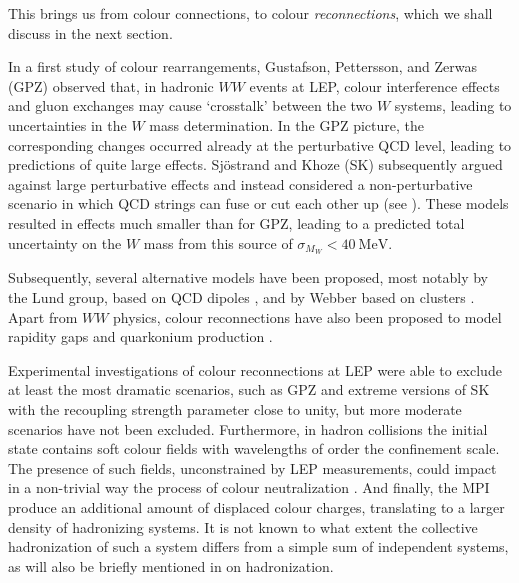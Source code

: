 This brings us from colour connections, to colour
\emph{reconnections}, which we shall discuss in the next section.

In a first study of colour rearrangements,
Gustafson, Pettersson, and Zerwas (GPZ) \cite{Gustafson:1988fs}
observed that, \eg in hadronic $WW$ events at LEP, colour interference
effects and gluon exchanges may cause `crosstalk' between the two
$W$ systems, leading \eg to uncertainties in the $W$ mass
determination.
In the GPZ picture, the corresponding changes occurred
already at the perturbative QCD level, leading to predictions
of quite large effects. Sj\"ostrand and Khoze (SK)
\cite{Sjostrand:1993rb,Sjostrand:1993hi}
subsequently argued against large perturbative effects
and instead considered a non-perturbative scenario in which
QCD strings can fuse or cut each other up (see \eg
\cite{Artru:1979ye}). These models resulted in
effects much smaller than for GPZ, leading to a predicted total uncertainty
on the $W$ mass from this source of $\sigma_{M_{W}}<40~\mathrm{MeV}$.

Subsequently, several alternative models have been proposed,
most notably by the Lund group, based on QCD dipoles
\cite{Gustafson:1994cd,Lonnblad:1995yk,Friberg:1996xc}, and by Webber based
on clusters \cite{Webber:1997iw}. Apart from $WW$ physics,
colour reconnections have also been proposed to model rapidity gaps
\cite{Buchmuller:1995qa,Edin:1995gi,Rathsman:1998tp,Enberg:2001vq}
and quarkonium production \cite{Edin:1997zb}.

Experimental investigations of colour reconnections at LEP
 \cite{Abbiendi:1998jb,Abbiendi:2005es,Schael:2006ns,
Abdallah:2006ve} were able to exclude at least the
most dramatic scenarios, such as GPZ and
extreme versions of SK with the recoupling strength parameter close to
unity, but more moderate scenarios have not been excluded.
Furthermore, in hadron collisions the initial state contains soft
colour fields with wavelengths of
order the confinement scale. The presence of such fields,
unconstrained by LEP measurements, could impact in a
non-trivial way the process of colour  neutralization
\cite{Buchmuller:1995qa,Edin:1995gi}. And finally,
the MPI produce an additional amount of displaced colour charges,
translating to a larger density of hadronizing systems. It is not
known to what extent the collective hadronization of such a system
differs from a simple sum of independent systems, as will also be briefly
mentioned in  on hadronization.

